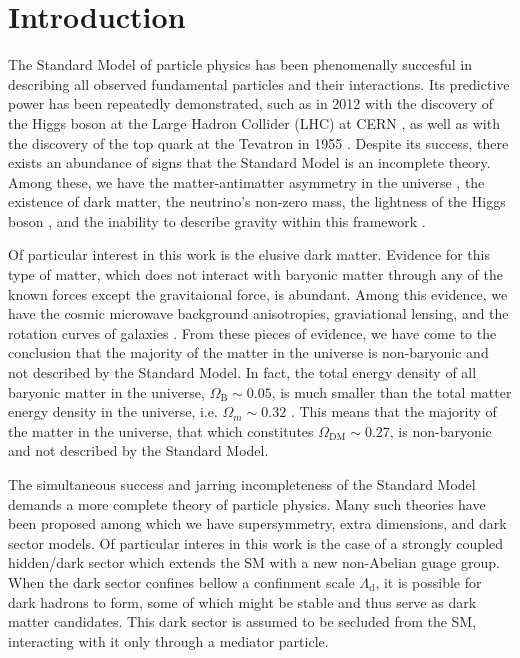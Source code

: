 \chapter{Introduction}

The Standard Model of particle physics has been phenomenally succesful in describing all observed fundamental particles and their interactions. Its predictive power has been repeatedly demonstrated, such as in 2012 with the discovery of the Higgs boson at the Large Hadron Collider (LHC) at CERN \cite{collaborationObservationNewBoson2012}, as well as with the discovery of the top quark at the Tevatron in 1955 \cite{abachiObservationTopQuark1995}. Despite its success, there exists an abundance of signs that the Standard Model is an incomplete theory. Among these, we have the matter-antimatter asymmetry in the universe \cite{}, the existence of dark matter, the neutrino's non-zero mass, the lightness of the Higgs boson \cite{saikumarExploringFrontiersChallenges2024}, and the inability to describe gravity within this framework \cite{}.

Of particular interest in this work is the elusive dark matter. Evidence for this type of matter, which does not interact with baryonic matter through any of the known forces except the gravitaional force, is abundant. Among this evidence, we have the cosmic microwave background anisotropies, graviational lensing, and the rotation curves of galaxies \cite{}. From these pieces of evidence, we have come to the conclusion that the majority of the matter in the universe is non-baryonic and not described by the Standard Model. In fact, the total energy density of all baryonic matter in the universe, $\Omega_{\text{B}} \sim 0.05$, is much smaller than the total matter energy density in the universe, i.e. $\Omega_{m} \sim 0.32$ \cite{}. This means that the majority of the matter in the universe, that which constitutes $\Omega_{\text{DM}} \sim 0.27$, is non-baryonic and not described by the Standard Model.

The simultaneous success and jarring incompleteness of the Standard Model demands a more complete theory of particle physics. Many such theories have been proposed among which we have supersymmetry, extra dimensions, and dark sector models. Of particular interes in this work is the case of a strongly coupled hidden/dark sector which extends the SM with a new non-Abelian guage group. When the dark sector confines bellow a confinment scale $\Lambda_{\text{d}}$, it is possible for dark hadrons to form, some of which might be stable and thus serve as dark matter candidates. This dark sector is assumed to be secluded from the SM, interacting with it only through a mediator particle.


